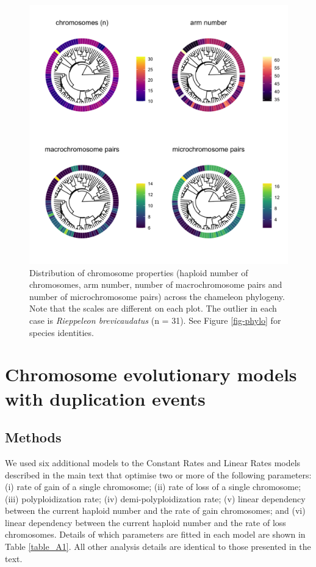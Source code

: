 \documentclass[a4paper, 12pt]{article}
\begin{document}
\newpage
\begin{figure}[H]
 \centering
  \includegraphics[width = \linewidth]{figures/trees-chromosome-properties.png}
  \caption{Distribution of chromosome properties (haploid number of chromosomes, arm number, number of macrochromosome pairs and number of microchromosome pairs) across the chameleon phylogeny. Note that the scales are different on each plot. The outlier in each case is \textit{Rieppeleon brevicaudatus} (n = 31). See Figure \ref{fig-phylo} for species identities.
}
  \label{fig-properties}
\end{figure} 

\newpage
\section{Chromosome evolutionary models with duplication events}

\subsection{Methods}

We used six additional models to the Constant Rates and Linear Rates models described in the main text that optimise two or more of the following parameters: (i) rate of gain of a single chromosome; (ii) rate of loss of a single chromosome; (iii) polyploidization rate; (iv) demi-polyploidization rate; (v) linear dependency between the current haploid number and the rate of gain chromosomes; and (vi) linear dependency between the current haploid number and the rate of loss chromosomes. Details of which parameters are fitted in each model are shown in Table \ref{table_A1}. All other analysis details are identical to those presented in the text.
\end{document}
